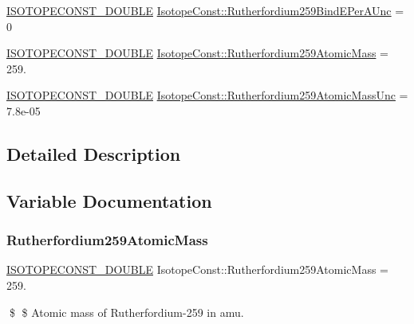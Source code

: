 \begin{DoxyCompactItemize}
\item 
\mbox{\hyperlink{group___isotope_const-_macros_ga8f45a7272ce02c0b4c65c44636ed719a}{I\+S\+O\+T\+O\+P\+E\+C\+O\+N\+S\+T\+\_\+\+D\+O\+U\+B\+LE}} \mbox{\hyperlink{group___isotope_const-_rutherfordium-_rf259_ga59d4da89038c8a5603b9ce0ad8156966}{Isotope\+Const\+::\+Rutherfordium259\+Bind\+E\+Per\+A\+Unc}} = 0
\item 
\mbox{\hyperlink{group___isotope_const-_macros_ga8f45a7272ce02c0b4c65c44636ed719a}{I\+S\+O\+T\+O\+P\+E\+C\+O\+N\+S\+T\+\_\+\+D\+O\+U\+B\+LE}} \mbox{\hyperlink{group___isotope_const-_rutherfordium-_rf259_ga80ce36eb25767b9d0170b0ebef485f59}{Isotope\+Const\+::\+Rutherfordium259\+Atomic\+Mass}} = 259.
\item 
\mbox{\hyperlink{group___isotope_const-_macros_ga8f45a7272ce02c0b4c65c44636ed719a}{I\+S\+O\+T\+O\+P\+E\+C\+O\+N\+S\+T\+\_\+\+D\+O\+U\+B\+LE}} \mbox{\hyperlink{group___isotope_const-_rutherfordium-_rf259_gae07b445114211d19c3aec9696e844a5c}{Isotope\+Const\+::\+Rutherfordium259\+Atomic\+Mass\+Unc}} = 7.\+8e-\/05
\end{DoxyCompactItemize}


\subsection{Detailed Description}


\subsection{Variable Documentation}
\mbox{\label{group___isotope_const-_rutherfordium-_rf259_ga80ce36eb25767b9d0170b0ebef485f59}} 
\subsubsection{\texorpdfstring{Rutherfordium259\+Atomic\+Mass}{Rutherfordium259AtomicMass}}
{\footnotesize\ttfamily \mbox{\hyperlink{group___isotope_const-_macros_ga8f45a7272ce02c0b4c65c44636ed719a}{I\+S\+O\+T\+O\+P\+E\+C\+O\+N\+S\+T\+\_\+\+D\+O\+U\+B\+LE}} Isotope\+Const\+::\+Rutherfordium259\+Atomic\+Mass = 259.}

\$ \$ Atomic mass of Rutherfordium-\/259 in amu. \mbox{\label{group___isotope_const-_rutherfordium-_rf259_gae07b445114211d19c3aec9696e844a5c}} 

